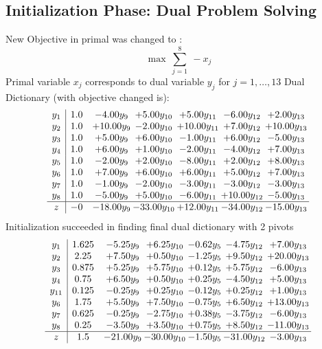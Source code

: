 \documentclass[9pt]{article}
\begin{document}
\subsection{Initialization Phase: Dual Problem Solving}
New Objective in primal was changed to : \[ \max\ \sum_{j=1}^{8}\ - x_j \] 
Primal variable $x_j$ corresponds to dual variable $y_j$ for $j = 1,\ldots,13$
Dual Dictionary (with objective changed is): 
\[\begin{array}{c| c c@{\hskip 2pt} c@{\hskip 2pt} c@{\hskip 2pt} c@{\hskip 2pt} c@{\hskip 2pt} }
 y_{1}   &  1.0 & -4.00 y_{9} & +  5.00 y_{10} & +  5.00 y_{11} & -6.00 y_{12} & +  2.00 y_{13}\\
 y_{2}   &  1.0 & + 10.00 y_{9} & -2.00 y_{10} & + 10.00 y_{11} & +  7.00 y_{12} & + 10.00 y_{13}\\
 y_{3}   &  1.0 & +  5.00 y_{9} & +  6.00 y_{10} & -1.00 y_{11} & +  6.00 y_{12} & -5.00 y_{13}\\
 y_{4}   &  1.0 & +  6.00 y_{9} & +  1.00 y_{10} & -2.00 y_{11} & -4.00 y_{12} & +  7.00 y_{13}\\
 y_{5}   &  1.0 & -2.00 y_{9} & +  2.00 y_{10} & -8.00 y_{11} & +  2.00 y_{12} & +  8.00 y_{13}\\
 y_{6}   &  1.0 & +  7.00 y_{9} & +  6.00 y_{10} & +  6.00 y_{11} & +  5.00 y_{12} & +  7.00 y_{13}\\
 y_{7}   &  1.0 & -1.00 y_{9} & -2.00 y_{10} & -3.00 y_{11} & -3.00 y_{12} & -3.00 y_{13}\\
 y_{8}   &  1.0 & -5.00 y_{9} & +  5.00 y_{10} & -6.00 y_{11} & + 10.00 y_{12} & -5.00 y_{13}\\
\hline
z    &  -0 & -18.00 y_{9} & -33.00 y_{10} & + 12.00 y_{11} & -34.00 y_{12} & -15.00 y_{13}\\
\end{array}\]
Initialization succeeded in finding final dual dictionary with 2 pivots
\[\begin{array}{c| c c@{\hskip 2pt} c@{\hskip 2pt} c@{\hskip 2pt} c@{\hskip 2pt} c@{\hskip 2pt} }
 y_{1}   &  1.625 & -5.25 y_{9} & +  6.25 y_{10} & -0.62 y_{5} & -4.75 y_{12} & +  7.00 y_{13}\\
 y_{2}   &  2.25 & +  7.50 y_{9} & +  0.50 y_{10} & -1.25 y_{5} & +  9.50 y_{12} & + 20.00 y_{13}\\
 y_{3}   &  0.875 & +  5.25 y_{9} & +  5.75 y_{10} & +  0.12 y_{5} & +  5.75 y_{12} & -6.00 y_{13}\\
 y_{4}   &  0.75 & +  6.50 y_{9} & +  0.50 y_{10} & +  0.25 y_{5} & -4.50 y_{12} & +  5.00 y_{13}\\
 y_{11}   &  0.125 & -0.25 y_{9} & +  0.25 y_{10} & -0.12 y_{5} & +  0.25 y_{12} & +  1.00 y_{13}\\
 y_{6}   &  1.75 & +  5.50 y_{9} & +  7.50 y_{10} & -0.75 y_{5} & +  6.50 y_{12} & + 13.00 y_{13}\\
 y_{7}   &  0.625 & -0.25 y_{9} & -2.75 y_{10} & +  0.38 y_{5} & -3.75 y_{12} & -6.00 y_{13}\\
 y_{8}   &  0.25 & -3.50 y_{9} & +  3.50 y_{10} & +  0.75 y_{5} & +  8.50 y_{12} & -11.00 y_{13}\\
\hline
z    &  1.5 & -21.00 y_{9} & -30.00 y_{10} & -1.50 y_{5} & -31.00 y_{12} & -3.00 y_{13}\\
\end{array}\]
\end{document}
